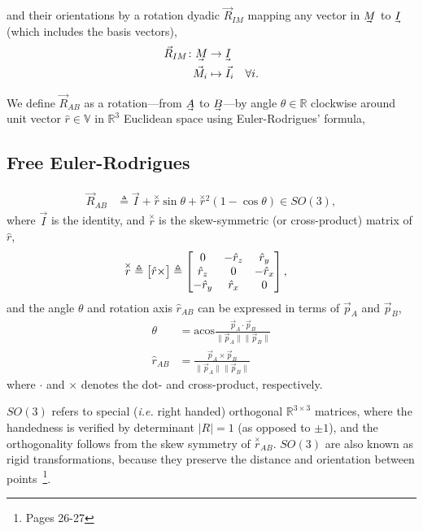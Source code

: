 and their orientations by a rotation dyadic $\vec{R}_{IM}$ mapping any vector in $\uvec{M}$ to $\uvec{I}$ (which includes the basis vectors),
%
\begin{align}
\vec{R}_{IM}\colon \uvec{M} &\to \uvec{I}\label{eq_rotation_dyadic}\\
\vec{M}_i &\mapsto \vec{I}_i \quad \forall i. \nonumber
\end{align}

We define $\vec{R}_{AB}$ as a rotation---from $\uvec{A}$ to $\uvec{B}$---by angle $\theta\in\mathbb{R}$ clockwise around unit vector $\hat{r}\in\mathbb{V}$ in $\mathbb{R}^3$ Euclidean space using Euler-Rodrigues' formula,

\subsection{Free Euler-Rodrigues}\label{IV_sec:free_euler_rodrigues}
%
\begin{align}\label{eq:M}
\vec{R}_{AB}
&\triangleq %
 \vec{I} + \overset{\times}{r}\sin\theta + \overset{\times}{r}{}^2(1-\cos\theta) \in SO(3),
\end{align}
%
where $\vec{I}$ is the identity, and $\overset{\times}{r}$ is the skew-symmetric (or cross-product) matrix of $\hat{r}$,
%
\begin{align}
\overset{\times}{r}
&\triangleq \bmat{\hat{r}\times} \triangleq \bmat{
0 & -\hat{r}_z & \hat{r}_y \\
\hat{r}_z & 0 & -\hat{r}_x \\
-\hat{r}_y & \hat{r}_x & 0
},
\end{align}
%
and the angle $\theta$ and rotation axis $\hat{r}_{AB}$ can be expressed in terms of $\vec{p}_A$ and $\vec{p}_{B}$,
%
\begin{align}
\theta
&= \mathrm{acos}\frac{\vec{p}_{A}\cdot\vec{p}_{B}}{\lVert\vec{p}_{A}\rVert\lVert\vec{p}_{B}\rVert} \\
\hat{r}_{AB} &=  \frac{\vec{p}_{A}\times\vec{p}_{B}}{\lVert\vec{p}_{A}\rVert\lVert\vec{p}_{B}\rVert}
\end{align}
%
where $\cdot$ and $\times$ denotes the dot- and cross-product, respectively.

$SO(3)$ refers to special (\emph{i.e.} right handed) orthogonal $\mathbb{R}^{3\times3}$ matrices, where the handedness is verified by determinant $\big|R\big|=1$ (as opposed to $\pm1$), and the orthogonality follows from the skew symmetry of $\overset{\times}{r}_{AB}$. $SO(3)$ are also known as rigid transformations, because they preserve the distance and orientation between points~\cite{Murray1994}\footnote{Pages 26-27}.

